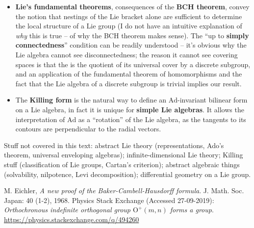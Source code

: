 \documentclass{article}
\newcommand{\Ad}{\mathrm{Ad}}
\newcommand{\gO}{\mathrm{O}}
\begin{document}
\begin{itemize}
\begin{itemize}
 \end{itemize}
 \item \textbf{Lie's fundamental theorems}, consequences of the \textbf{BCH theorem}, convey the notion that nestings of the Lie bracket alone are sufficient to determine the local structure of a Lie group (I do not have an intuitive explanation of \emph{why} this is true -- of why the BCH theorem makes sense). The ``up to \textbf{simply connectedness}'' condition can be readily understood -- it's obvious why the Lie algebra cannot see disconnectedness; the reason it cannot see covering spaces is that the is the quotient of its universal cover by a discrete subgroup, and an application of the fundamental theorem of homomorphisms and the fact that the Lie algebra of a discrete subgroup is trivial implies our result.
 \item The \textbf{Killing form} is the natural way to define an $\Ad$-invariant bilinear form on a Lie algebra, in fact it is unique for \textbf{simple Lie algebras}. It allows the interpretation of $\Ad$ as a ``rotation'' of the Lie algebra, as the tangents to its contours are perpendicular to the radial vectors.
\end{itemize}
Stuff not covered in this text: abstract Lie theory (representations, Ado's theorem, universal enveloping algebras); infinite-dimensional Lie theory; Killing stuff (classification of Lie groups, Cartan's criterion); abstract algebraic things (solvability, nilpotence, Levi decomposition);  differential geometry on a Lie group.

\begin{thebibliography}{19}
M. Eichler, \emph{A new proof of the Baker-Cambell-Hausdorff formula}. J. Math. Soc. Japan: 40 (1-2), 1968.
Physics Stack Exchange (Accessed 27-09-2019): \emph{Orthochronous indefinite orthogonal group $\gO^+(m,n)$ forms a group}. \url{https://physics.stackexchange.com/q/494260}

\end{thebibliography}
\end{document}
